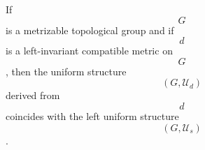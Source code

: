 If $$G$$ is a metrizable topological group and if $$d$$ is a left-invariant compatible metric on $$G$$, then the uniform structure $$(G, \mathcal{U}_d)$$ derived from $$d$$ coincides with the left uniform structure $$(G, \mathcal{U}_s)$$.
